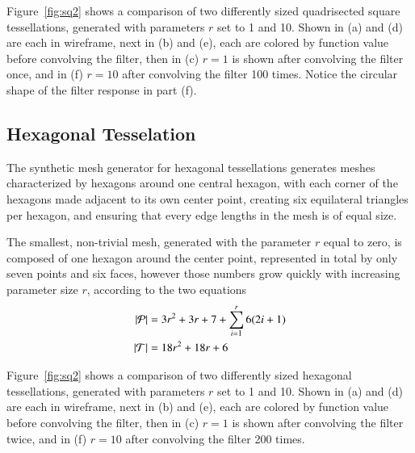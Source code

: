 Figure~\ref{fig:sq2} shows a comparison of two differently sized quadrisected square tessellations, generated with parameters $r$ set to 1 and 10. Shown in (a) and (d) are each in wireframe, next in (b) and (e), each are colored by function value before convolving the filter, then in (c) $r=1$ is shown after convolving the filter once, and in (f) $r=10$ after convolving the filter 100 times. Notice the circular shape of the filter response in part (f).



%
%
%
%
\pagebreak
\subsection{Hexagonal Tesselation}
\label{ch6sSTDDssHT}
The synthetic mesh generator for hexagonal tessellations generates meshes characterized by hexagons around one central hexagon, with each corner of the hexagons made adjacent to its own center point, creating six equilateral triangles per hexagon, and ensuring that every edge lengths in the mesh is of equal size.

The smallest, non-trivial mesh, generated with the parameter $r$ equal to zero, is composed of one hexagon around the center point, represented in total by only seven points and six faces, however those numbers grow quickly with increasing parameter size $r$, according to the two equations
\begin{align}
	|\mathcal{P}| &= 3r^2 + 3r + 7 +\sum_{i=1}^r{6(2i + 1)}\\
	|\mathcal{T}| &= 18r^2 + 18r + 6
	\label{eq:hexPointAndFaceCounts}
\end{align}

Figure~\ref{fig:sq2} shows a comparison of two differently sized hexagonal tessellations, generated with parameters $r$ set to 1 and 10. Shown in (a) and (d) are each in wireframe, next in (b) and (e), each are colored by function value before convolving the filter, then in (c) $r=1$ is shown after convolving the filter twice, and in (f) $r=10$ after convolving the filter 200 times.


%
%
%
%
\pagebreak

